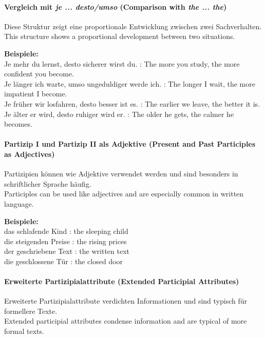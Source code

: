 \documentclass[a4paper]{article}
\begin{document}
        \paragraph{Vergleich mit \textit{je ... desto/umso} {\small (Comparison with \textit{the ... the})}}
            Diese Struktur zeigt eine proportionale Entwicklung zwischen zwei Sachverhalten.\\
            This structure shows a proportional development between two situations.
            
            \textbf{Beispiele:}\\
            Je mehr du lernst, desto sicherer wirst du. : The more you study, the more confident you become.\\
            Je länger ich warte, umso ungeduldiger werde ich. : The longer I wait, the more impatient I become.\\
            Je früher wir losfahren, desto besser ist es. : The earlier we leave, the better it is.\\
            Je älter er wird, desto ruhiger wird er. : The older he gets, the calmer he becomes.
        
        \paragraph{Partizip I und Partizip II als Adjektive {\small (Present and Past Participles as Adjectives)}}
            Partizipien können wie Adjektive verwendet werden und sind besonders in schriftlicher Sprache häufig.\\
            Participles can be used like adjectives and are especially common in written language.
            
            \textbf{Beispiele:}\\
            das schlafende Kind : the sleeping child\\
            die steigenden Preise : the rising prices\\
            der geschriebene Text : the written text\\
            die geschlossene Tür : the closed door
        
        \paragraph{Erweiterte Partizipialattribute {\small (Extended Participial Attributes)}}
            Erweiterte Partizipialattribute verdichten Informationen und sind typisch für formellere Texte.\\
            Extended participial attributes condense information and are typical of more formal texts.
            
\end{document}
